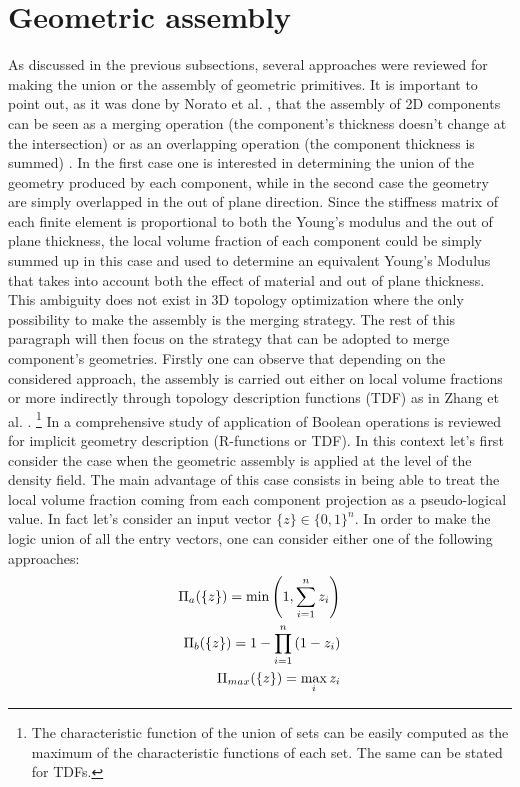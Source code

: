 \section{Geometric assembly}
\label{GA}
As discussed in the previous subsections, several approaches were reviewed for making the union or the assembly of geometric primitives.
It is important to point out, as it was done by Norato et al. \cite{norato2015geometry} , that the assembly of 2D components can be seen as a merging operation (the component's thickness doesn't change at the intersection) or as an overlapping operation (the component thickness is summed) .
In the first case one is interested in determining the union of the geometry produced by each component, while in the second case the geometry are simply overlapped in the out of plane direction. Since the stiffness matrix of each finite element is proportional to both the Young's modulus and the out of plane thickness, the local volume fraction of each component could be simply summed up in this case and used to determine an equivalent Young's Modulus that takes into account both the effect of material and out of plane thickness.
This ambiguity does not exist in 3D topology optimization where the only possibility to make the assembly is the merging strategy. The rest of this paragraph will then focus on the strategy that can be adopted to merge component's geometries.
Firstly one can observe that depending on the considered approach, the assembly is carried out either on local volume fractions or more indirectly through topology description functions (TDF) as in Zhang et al. \cite{zhang2016new}. 
 \footnote{The characteristic function of the union of sets can be easily computed as the maximum of the characteristic functions of each set. The same can be stated for TDFs.}
 In \cite{zhang2017comprehensive} a comprehensive study of application of Boolean operations is reviewed for implicit geometry description (R-functions or TDF).
 In this context let's first consider the case when the geometric assembly is applied at the level of the density field. The main advantage of this case consists in being able to treat the local volume fraction coming from each component projection as a pseudo-logical value. In fact let's consider an input vector $\lbrace{z}\rbrace \in \{0,1\}^n$. In order to make the logic union of all the entry vectors, one can consider either one of the following approaches:
 \begin{eqnarray}
 \Pi_a(\left\{{z}\right\})=\min\left(1,\sum_{i=1}^n{z_i}\right)\\
 \Pi_b(\left\{{z}\right\})=1-\prod_{i=1}^n{\left(1-z_i\right)}\\
 \Pi_{max}(\left\{{z}\right\})=\max_i{z_i}
 \end{eqnarray}
